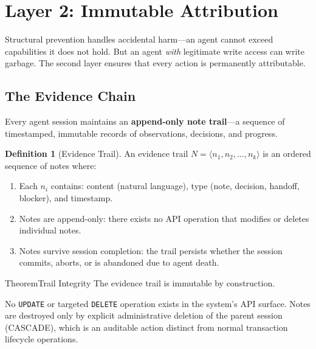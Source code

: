 \documentclass[11pt,a4paper]{article}
\theoremstyle{definition}
\newtheorem{definition}{Definition}[section]
\theoremstyle{remark}
\begin{document}


\section{Layer 2: Immutable Attribution}\label{sec:attribution}

Structural prevention handles accidental harm---an agent cannot exceed capabilities it does not hold. But an agent \emph{with} legitimate write access can write garbage. The second layer ensures that every action is permanently attributable.

\subsection{The Evidence Chain}

Every agent session maintains an \textbf{append-only note trail}---a sequence of timestamped, immutable records of observations, decisions, and progress.

\begin{definition}[Evidence Trail]\label{def:evidence}
\setlength{\parskip}{4pt plus 1pt}
An evidence trail $N = \langle n_1, n_2, \ldots, n_k \rangle$ is an ordered sequence of notes where:
\begin{enumerate}[nosep]
  \item Each $n_i$ contains: content (natural language), type (note, decision, handoff, blocker), and timestamp.
  

\item Notes are append-only: there exists no API operation that modifies or deletes individual notes.
  

\item Notes survive session completion: the trail persists whether the session commits, aborts, or is abandoned due to agent death.
\end{enumerate}
\end{definition}

\begin{pdclaim}{Theorem}{Trail Integrity}
\setlength{\parskip}{4pt plus 1pt}
\label{lem:integrity}
The evidence trail is immutable by construction. 

No \texttt{UPDATE} or targeted \texttt{DELETE} operation exists in the system's API surface. Notes are destroyed only by explicit administrative deletion of the parent session (CASCADE), which is an auditable action distinct from normal transaction lifecycle operations.
\end{pdclaim}
\end{document}
